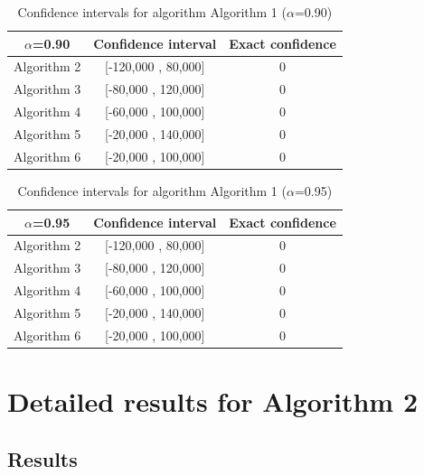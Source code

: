 \documentclass[a4paper,10pt]{article}
\begin{document}
\begin{table}[!htp]
\centering\small
\begin{tabular}{
|c|c|c|}
\hline
 $\alpha$=0.90 & Confidence interval & Exact confidence \\ \hline 
Algorithm 2 & [-120,000 , 80,000] & 0\\ \hline 
Algorithm 3 & [-80,000 , 120,000] & 0\\ \hline 
Algorithm 4 & [-60,000 , 100,000] & 0\\ \hline 
Algorithm 5 & [-20,000 , 140,000] & 0\\ \hline 
Algorithm 6 & [-20,000 , 100,000] & 0\\ \hline 

\end{tabular}
\caption{Confidence intervals for algorithm Algorithm 1 ($\alpha$=0.90)}
\end{table}
\begin{table}[!htp]
\centering\small
\begin{tabular}{
|c|c|c|}
\hline
 $\alpha$=0.95 & Confidence interval & Exact confidence \\ \hline 
Algorithm 2 & [-120,000 , 80,000] & 0\\ \hline 
Algorithm 3 & [-80,000 , 120,000] & 0\\ \hline 
Algorithm 4 & [-60,000 , 100,000] & 0\\ \hline 
Algorithm 5 & [-20,000 , 140,000] & 0\\ \hline 
Algorithm 6 & [-20,000 , 100,000] & 0\\ \hline 

\end{tabular}
\caption{Confidence intervals for algorithm Algorithm 1 ($\alpha$=0.95)}
\end{table}

 \clearpage 


\section{Detailed results for Algorithm 2}


\subsection{Results}
\end{document}
